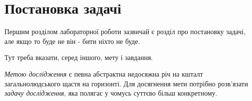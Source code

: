 
\chapter{Постановка задачі}
\label{chap:problem}  %

Першим розділом лабораторної роботи зазвичай є розділ про постановку задачі, але якщо то буде не він - бити ніхто не буде.

Тут треба вказати, серед іншого, мету і завдання.

\textit{Метою дослідження} є певна абстрактна недосяжна річ на кшталт 
загальнолюдського щастя на горизонті. Для досягнення мети потрібно 
розв'язати \textit{задачу дослідження}, яка полягає у чомусь суттєво більш 
конкретному.

